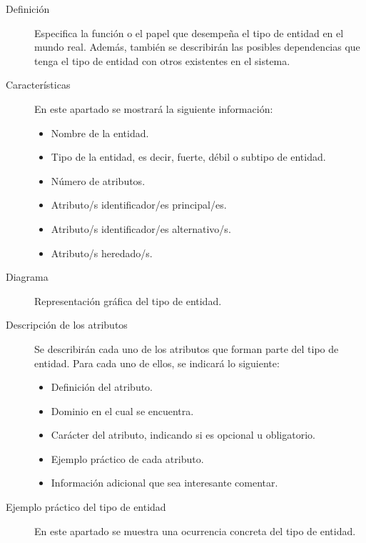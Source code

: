    \begin{description}
      \item[Definición] Especifica la función o el papel que desempeña el tipo
           de entidad en el mundo real. Además, también se describirán las
           posibles dependencias que tenga el tipo de entidad con otros
           existentes en el sistema.

      \item[Características] En este apartado se mostrará la siguiente
           información:

            \begin{itemize}
             \item Nombre de la entidad.
             \item Tipo de la entidad, es decir, fuerte, débil o subtipo de
                   entidad.
             \item Número de atributos.
             \item Atributo/s identificador/es principal/es.
             \item Atributo/s identificador/es alternativo/s.
             \item Atributo/s heredado/s.
            \end{itemize}

      \item[Diagrama] Representación gráfica del tipo de entidad.

      \item[Descripción de los atributos] Se describirán cada uno de los
           atributos que forman parte del tipo de entidad. Para cada uno de
           ellos, se indicará lo siguiente:

           \begin{itemize}
            \item Definición del atributo.
            \item Dominio en el cual se encuentra.
            \item Carácter del atributo, indicando si es opcional u obligatorio.
            \item Ejemplo práctico de cada atributo.
            \item Información adicional que sea interesante comentar.
           \end{itemize}

      \item[Ejemplo práctico del tipo de entidad] En este apartado se muestra
           una ocurrencia concreta del tipo de entidad.

   \end{description}

